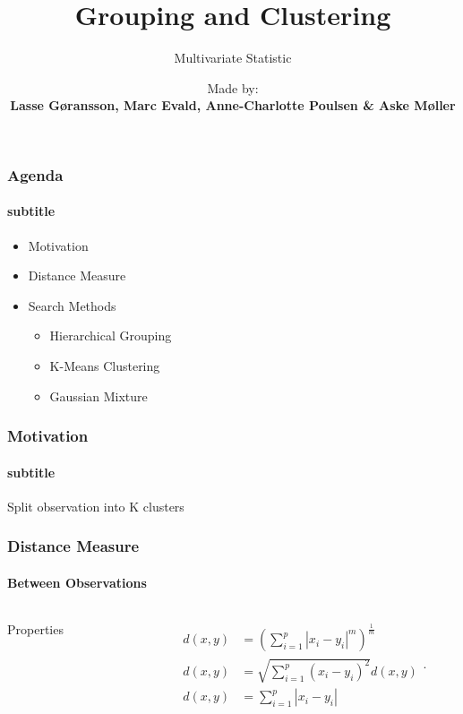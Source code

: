 \documentclass[aspectratio=169,10pt,t]{beamer}
\title{Grouping and Clustering}
\subtitle{Multivariate Statistic}
\date{ }
\author{
	Made by: \\
	\textbf{Lasse Gøransson, Marc Evald, Anne-Charlotte Poulsen \& Aske Møller}
}
\institute[
  SDU Robotics\\
  The Maersk Mc-Kinney Moller Institute\\
  University of Southern Denmark
] %
{%
  SDU Robotics\\
  The Maersk Mc-Kinney Moller Institute\\
  University of Southern Denmark

}
\begin{document}
{\SDUwavesbg%
\begin{frame} %
  \titlepage
\end{frame}}


\begin{frame}[t]
	\frametitle{Agenda}
	\framesubtitle{subtitle}

	\begin{itemize}
		\item Motivation
		\item Distance Measure
		\item Search Methods
		\begin{itemize}
			\item Hierarchical Grouping
			\item K-Means Clustering
			\item Gaussian Mixture
		\end{itemize}
	\end{itemize}
	
\end{frame}

\begin{frame}[t]
	\frametitle{Motivation}
	\framesubtitle{subtitle}

	Split observation into K clusters
	
\end{frame}

\begin{frame}[t]
	\frametitle{Distance Measure}
	\framesubtitle{Between Observations}

	\begin{columns}
		\begin{column}{0.3\textwidth}

			Properties

		\end{column}
		\begin{column}{0.5\textwidth}

	\[
		\begin{aligned}
			d \left( x ,y  \right) 
			&=
			 \left( 
				 \sum^{p}_{i=1} | x_i - y_i | ^{m}
			 \right) ^{ \frac{1}{m} }
			 \\
			d \left( x ,y  \right) 
			&=
			\sqrt{
				\sum^{p}_{i=1}  \left(  x_i - y_i  \right)  ^{2}
			}
			d \left( x ,y  \right) 
			\\
			d \left( x,y \right) 
			&=
				\sum^{p}_{i=1}  | x_i - y_i |
		\end{aligned}
	.\] 
			
		\end{column}
	\end{columns}

	
\end{frame}
\end{document}
